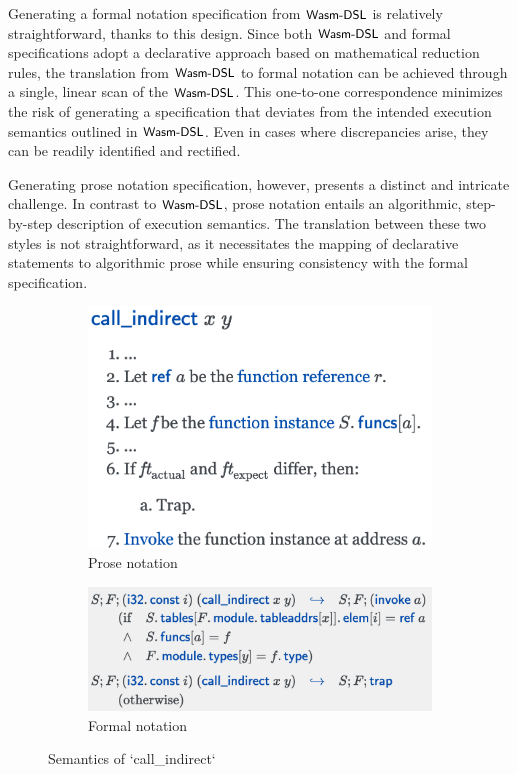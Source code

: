 Generating a formal notation specification from $\textsf{\small Wasm-DSL}$ is relatively
straightforward, thanks to this design. Since both $\textsf{\small Wasm-DSL}$ and formal
specifications adopt a declarative approach based on mathematical reduction
rules, the translation from $\textsf{\small Wasm-DSL}$ to formal notation can be achieved through a
single, linear scan of the $\textsf{\small Wasm-DSL}$. This one-to-one correspondence minimizes the
risk of generating a specification that deviates from the intended execution
semantics outlined in $\textsf{\small Wasm-DSL}$. Even in cases where discrepancies arise, they can
be readily identified and rectified.

Generating prose notation specification, however, presents a distinct and
intricate challenge. In contrast to $\textsf{\small Wasm-DSL}$, prose notation entails an
algorithmic, step-by-step description of execution semantics. The translation
between these two styles is not straightforward, as it necessitates the mapping
of declarative statements to algorithmic prose while ensuring consistency with
the formal specification.

\begin{figure}
  \centering
  \begin{subfigure}[b]{0.45\textwidth}
    \includegraphics[width=\textwidth]{../img/prosespec2}
    \caption{Prose notation}
    \label{fig:prosespec2}
  \end{subfigure}
  \hfill
  \begin{subfigure}[b]{0.45\textwidth}
    \includegraphics[width=\textwidth]{../img/formalspec2}
    \caption{Formal notation}
    \label{fig:formalspec2}
  \end{subfigure}

  \caption{Semantics of `call\_indirect`}
  \label{fig:spec2}
\end{figure}

